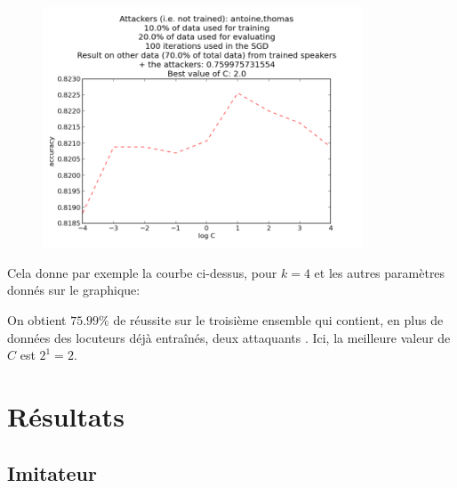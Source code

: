 \documentclass{article}
\begin{document}
\begin{figure}[!h]
\includegraphics[width=0.85\textwidth]{../bestC}
\end{figure}
Cela donne par exemple la courbe ci-dessus, pour $k=4$ et les autres paramètres donnés sur le graphique:

On obtient $75.99 \%$ de réussite sur le troisième ensemble qui contient, en plus de données des locuteurs déjà entraînés, deux \og attaquants \fg. Ici, la meilleure valeur de $C$ est $2^1 = 2$.
\section{Résultats}
\subsection{Imitateur}
\label{imitateur}
\end{document}
